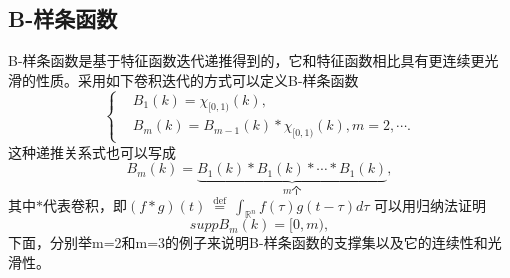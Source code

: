 \subsection{B-样条函数}
B-样条函数\cite{prochazkova2005derivative}是基于特征函数迭代递推得到的，它和特征函数相比具有更连续更光滑的性质。采用如下卷积迭代的方式可以定义B-样条函数
\begin{equation}
    \left\{\begin{matrix} 
&B_{1}(k)=\chi_{\lbrack0,1)}(k),\\
&B_{m}(k)=B_{m-1}(k)\ast\chi_{\lbrack0,1)}(k),m=2,\cdots.\label{b-spline}%
\end{matrix}\right. 
\end{equation}
这种递推关系式也可以写成
\begin{equation}
    B_{m}(k)=\underbrace{B_1(k) * B_{1}(k) * \cdots * B_{1}(k)}_{m \text{个}},
\end{equation}
其中$*$代表卷积，即$(f * g)(t) \stackrel{\text { def }}{=} \int_{\mathbb{R}^{n}} f(\tau) g(t-\tau) d \tau$
可以用归纳法证明
\begin{equation}
    supp B_{m}(k)=[0,m),
\end{equation}
下面，分别举m=2和m=3的例子来说明B-样条函数的支撑集以及它的连续性和光滑性。

